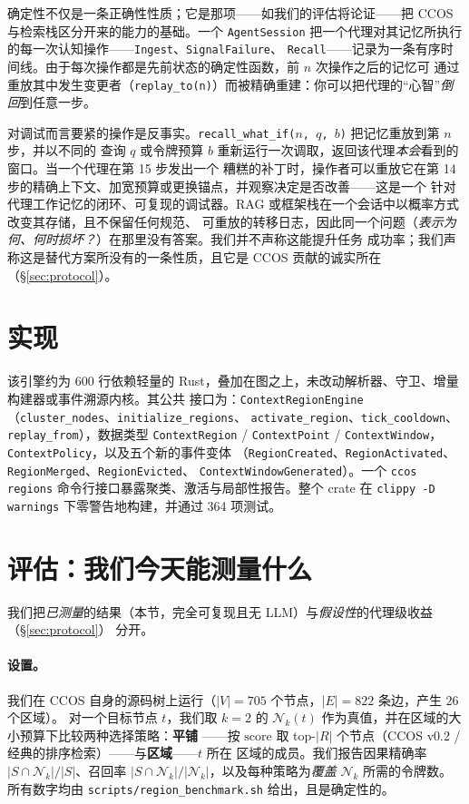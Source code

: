 \documentclass[11pt]{ctexart}
\newcommand{\Nk}{\mathcal{N}_k}
\newcommand{\code}[1]{\texttt{#1}}
\begin{document}
确定性不仅是一条正确性性质；它是那项——如我们的评估将论证——把 CCOS 与检索栈区分开来的能力的基础。一个
\code{AgentSession} 把一个代理对其记忆所执行的每一次认知操作——\code{Ingest}、\code{SignalFailure}、
\code{Recall}——记录为一条有序时间线。由于每次操作都是先前状态的确定性函数，前 $n$ 次操作之后的记忆可
通过重放其中发生变更者（\code{replay\_to(n)}）而被精确重建：你可以把代理的“心智”\emph{倒回}到任意一步。

对调试而言要紧的操作是反事实。\code{recall\_what\_if($n$, $q$, $b$)} 把记忆重放到第 $n$ 步，并以不同的
查询 $q$ 或令牌预算 $b$ 重新运行一次调取，返回该代理\emph{本会}看到的窗口。当一个代理在第 15 步发出一个
糟糕的补丁时，操作者可以重放它在第 14 步的精确上下文、加宽预算或更换锚点，并观察决定是否改善——这是一个
针对代理工作记忆的闭环、可复现的调试器。RAG 或框架栈在一个会话中以概率方式改变其存储，且不保留任何规范、
可重放的转移日志，因此同一个问题（\emph{表示为何、何时损坏？}）在那里没有答案。我们并不声称这能提升任务
成功率；我们声称这是替代方案所没有的一条性质，且它是 CCOS 贡献的诚实所在（\S\ref{sec:protocol}）。

\section{实现}\label{sec:impl}

该引擎约为 $600$ 行依赖轻量的 Rust，叠加在图之上，未改动解析器、守卫、增量构建器或事件溯源内核。其公共
接口为：\code{ContextRegionEngine}（\code{cluster\_nodes}、\code{initialize\_regions}、
\code{activate\_region}、\code{tick\_cooldown}、\code{replay\_from}），数据类型 \code{ContextRegion} /
\code{ContextPoint} / \code{ContextWindow}，\code{ContextPolicy}，以及五个新的事件变体
（\code{RegionCreated}、\code{RegionActivated}、\code{RegionMerged}、\code{RegionEvicted}、
\code{ContextWindowGenerated}）。一个 \code{ccos regions} 命令行接口暴露聚类、激活与局部性报告。整个
crate 在 \code{clippy -D warnings} 下零警告地构建，并通过 364 项测试。

\section{评估：我们今天能测量什么}\label{sec:eval}

我们把\emph{已测量}的结果（本节，完全可复现且无 LLM）与\emph{假设性}的代理级收益（\S\ref{sec:protocol}）
分开。

\paragraph{设置。} 我们在 CCOS 自身的源码树上运行（$|V|=705$ 个节点，$|E|=822$ 条边，产生 $26$ 个区域）。
对一个目标节点 $t$，我们取 $k=2$ 的 $\Nk(t)$ 作为真值，并在区域的大小预算下比较两种选择策略：\textbf{平铺}
——按 $\mathrm{score}$ 取 top-$|R|$ 个节点（CCOS v0.2 / 经典的排序检索）——与\textbf{区域}——$t$ 所在
区域的成员。我们报告因果精确率 $|S\cap\Nk|/|S|$、召回率 $|S\cap\Nk|/|\Nk|$，以及每种策略为\emph{覆盖}
$\Nk$ 所需的令牌数。所有数字均由 \code{scripts/region\_benchmark.sh} 给出，且是确定性的。
\end{document}
